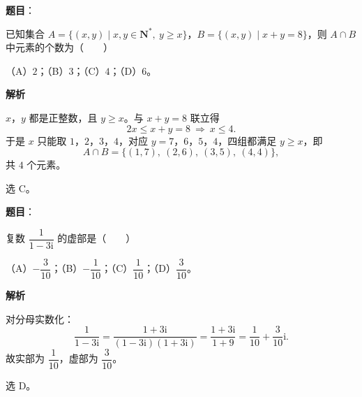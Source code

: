 

\begin{answer}

\textbf{题目}：

已知集合 $A=\{(x,y)\mid x,y\in\mathbf N^*,\ y\geqslant x\}$，$B=\{(x,y)\mid x+y=8\}$，则 $A\cap B$ 中元素的个数为\mbox{（　　）}

（A）$2$；（B）$3$；（C）$4$；（D）$6$。

\textbf{解析}

$x$，$y$ 都是正整数，且 $y\geqslant x$。与 $x+y=8$ 联立得
\nopagebreak[4]
\[2x\leqslant x+y=8\ \Longrightarrow\ x\leqslant4 .\]
于是 $x$ 只能取 $1$，$2$，$3$，$4$，对应 $y=7$，$6$，$5$，$4$，四组都满足 $y\geqslant x$，即
\nopagebreak[4]
\[A\cap B=\{(1,7),\ (2,6),\ (3,5),\ (4,4)\},\]
共 $4$ 个元素。

选 C。


\end{answer}
\begin{answer}

\textbf{题目}：

复数 $\dfrac1{1-3\mathrm i}$ 的虚部是\mbox{（　　）}

（A）$-\dfrac3{10}$；（B）$-\dfrac1{10}$；（C）$\dfrac1{10}$；（D）$\dfrac3{10}$。

\textbf{解析}

对分母实数化：
\nopagebreak[4]
\[\frac1{1-3\mathrm i}=\frac{1+3\mathrm i}{(1-3\mathrm i)(1+3\mathrm i)}=\frac{1+3\mathrm i}{1+9}=\frac1{10}+\frac3{10}\mathrm i .\]
故实部为 $\dfrac1{10}$，虚部为 $\dfrac3{10}$。

选 D。


\end{answer}
